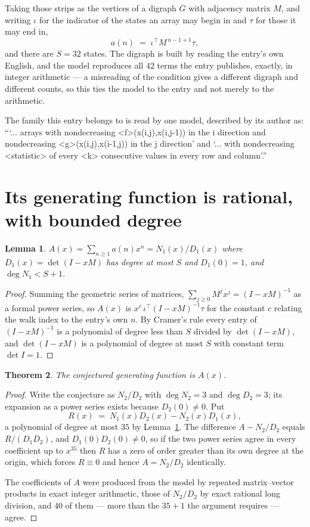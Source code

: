 \documentclass[11pt,a4paper]{article}
\theoremstyle{plain}
\newtheorem{theorem}{Theorem}
\newtheorem{lemma}[theorem]{Lemma}
\theoremstyle{definition}
\begin{document}
Taking those strips as the vertices of a digraph $G$ with adjacency matrix $M$, and writing
$\iota$ for the indicator of the states an array may begin in and $\tau$ for those it may end
in,
\[
a(n)\;=\;\iota^{\!\top}M^{\,n-1+1}\tau ,
\]
and there are $S=32$ states. The digraph is built by reading the entry's own English, and the
model reproduces all $42$ terms the entry publishes, exactly, in integer arithmetic --- a
misreading of the condition gives a different digraph and different counts, so this ties the
model to the entry and not merely to the arithmetic.

The family this entry belongs to is read by one model, described by its author as: ```... arrays with nondecreasing <f>(x(i,j),x(i,j-1)) in the i direction and nondecreasing <g>(x(i,j),x(i-1,j)) in the j direction' and `... with nondecreasing <statistic> of every <k> consecutive values in every row and column'.''


\section{Its generating function is rational, with bounded degree}

\begin{lemma}\label{lem:rat}
$A(x)=\sum_{n\ge1}a(n)x^n=N_1(x)/D_1(x)$ where $D_1(x)=\det(I-xM)$ has degree at most
$S$ and $D_1(0)=1$, and $\deg N_1<S+1$.
\end{lemma}

\begin{proof}
Summing the geometric series of matrices, $\sum_{j\ge0}M^jx^j=(I-xM)^{-1}$ as a formal
power series, so $A(x)$ is $x^{c}\,\iota^{\!\top}(I-xM)^{-1}\tau$ for the constant $c$
relating the walk index to the entry's own $n$. By Cramer's rule every entry of
$(I-xM)^{-1}$ is a polynomial of degree less than $S$ divided by $\det(I-xM)$, and
$\det(I-xM)$ is a polynomial of degree at most $S$ with constant term $\det I=1$.
\end{proof}

\begin{theorem}
The conjectured generating function is $A(x)$.
\end{theorem}

\begin{proof}
Write the conjecture as $N_2/D_2$ with $\deg N_2=3$ and $\deg D_2=3$; its expansion as a
power series exists because $D_2(0)\neq0$. Put
\[
R(x)\;=\;N_1(x)D_2(x)-N_2(x)D_1(x),
\]
a polynomial of degree at most $35$ by Lemma~\ref{lem:rat}. The difference
$A-N_2/D_2$ equals $R/(D_1D_2)$, and $D_1(0)D_2(0)\neq0$, so if the two power series agree in
every coefficient up to $x^{35}$ then $R$ has a zero of order greater than its own
degree at the origin, which forces $R\equiv0$ and hence $A=N_2/D_2$ identically.

The coefficients of $A$ were produced from the model by repeated matrix--vector products in
exact integer arithmetic, those of $N_2/D_2$ by exact rational long division, and $40$
of them --- more than the $35+1$ the argument requires --- agree.
\end{proof}
\end{document}
